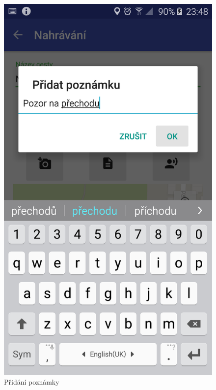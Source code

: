 \documentclass{article}
\begin{document}
\begin{figure}[H]
\begin{minipage}{.5\textwidth}
\centering
                \includegraphics[scale=0.14]{img/screen/pridanipoznamky.png}
        \caption{Přidání poznámky}
        \label{fig:pridanipoznamky}
\end{minipage}
\begin{minipage}{.5\textwidth}
  \centering

\end{minipage}
\end{figure}
\end{document}
